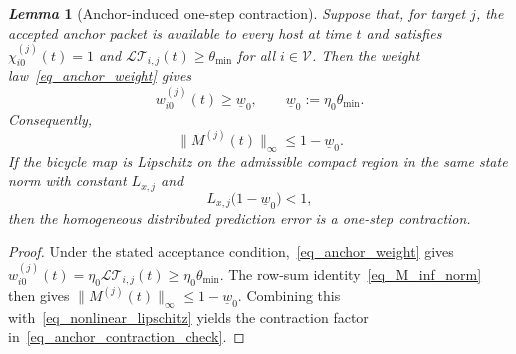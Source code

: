 \documentclass[letterpaper,journal]{IEEEtran}
\def\V{\mathcal{V}} %
\def\LT{\mathcal{LT}} %
\newtheorem{lemma}{\it Lemma}%
\begin{document}
\begin{lemma}[Anchor-induced one-step contraction]\label{lem_anchor_contraction}
Suppose that, for target $j$, the accepted anchor packet is available to every host at time $t$ and satisfies $\chi_{i0}^{(j)}(t)=1$ and $\LT_{i,j}(t)\ge\theta_{\min}$ for all $i\in\V$. Then the weight law~\eqref{eq_anchor_weight} gives
\begin{equation}
    w_{i0}^{(j)}(t)\ge \underline w_0,
    \qquad
    \underline w_0:=\eta_0\theta_{\min} .
\end{equation}
Consequently,
\begin{equation}
    \|M^{(j)}(t)\|_{\infty}\le 1-\underline w_0.
\end{equation}
If the bicycle map is Lipschitz on the admissible compact region in the same state norm with constant $L_{x,j}$ and
\begin{equation}
    L_{x,j}\big(1-\underline w_0\big)<1,
    \label{eq_anchor_contraction_check}
\end{equation}
then the homogeneous distributed prediction error is a one-step contraction.
\end{lemma}
\begin{proof}
Under the stated acceptance condition,~\eqref{eq_anchor_weight} gives $w_{i0}^{(j)}(t)=\eta_0\LT_{i,j}(t)\ge\eta_0\theta_{\min}$. The row-sum identity~\eqref{eq_M_inf_norm} then gives $\|M^{(j)}(t)\|_{\infty}\le1-\underline w_0$. Combining this with~\eqref{eq_nonlinear_lipschitz} yields the contraction factor in~\eqref{eq_anchor_contraction_check}.
\end{proof}
\end{document}
